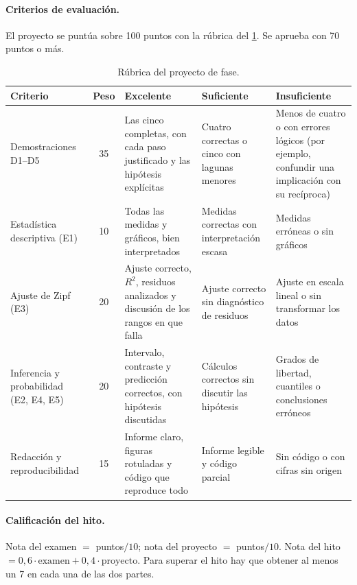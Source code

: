 \paragraph{Criterios de evaluación.} El proyecto se puntúa sobre 100 puntos con la rúbrica del \cref{tab:rubrica}. Se aprueba con 70 puntos o más.

\begin{table}[h]
\centering\footnotesize
\caption{Rúbrica del proyecto de fase.}\label{tab:rubrica}
\begin{tabularx}{\textwidth}{@{}>{\raggedright\arraybackslash}p{2.5cm}c>{\raggedright\arraybackslash}X>{\raggedright\arraybackslash}X>{\raggedright\arraybackslash}X@{}}
\toprule
Criterio & Peso & Excelente & Suficiente & Insuficiente \\
\midrule
Demostraciones D1--D5 & 35 & Las cinco completas, con cada paso justificado y las hipótesis explícitas & Cuatro correctas o cinco con lagunas menores & Menos de cuatro o con errores lógicos (por ejemplo, confundir una implicación con su recíproca) \\
\addlinespace
Estadística descriptiva (E1) & 10 & Todas las medidas y gráficos, bien interpretados & Medidas correctas con interpretación escasa & Medidas erróneas o sin gráficos \\
\addlinespace
Ajuste de Zipf (E3) & 20 & Ajuste correcto, $R^{2}$, residuos analizados y discusión de los rangos en que falla & Ajuste correcto sin diagnóstico de residuos & Ajuste en escala lineal o sin transformar los datos \\
\addlinespace
Inferencia y probabilidad (E2, E4, E5) & 20 & Intervalo, contraste y predicción correctos, con hipótesis discutidas & Cálculos correctos sin discutir las hipótesis & Grados de libertad, cuantiles o conclusiones erróneos \\
\addlinespace
Redacción y reproducibilidad & 15 & Informe claro, figuras rotuladas y código que reproduce todo & Informe legible y código parcial & Sin código o con cifras sin origen \\
\bottomrule
\end{tabularx}
\end{table}

\paragraph{Calificación del hito.} Nota del examen $=$ puntos$/10$; nota del proyecto $=$ puntos$/10$. Nota del hito $=0{,}6\cdot\text{examen}+0{,}4\cdot\text{proyecto}$. Para superar el hito hay que obtener al menos un 7 en cada una de las dos partes.
